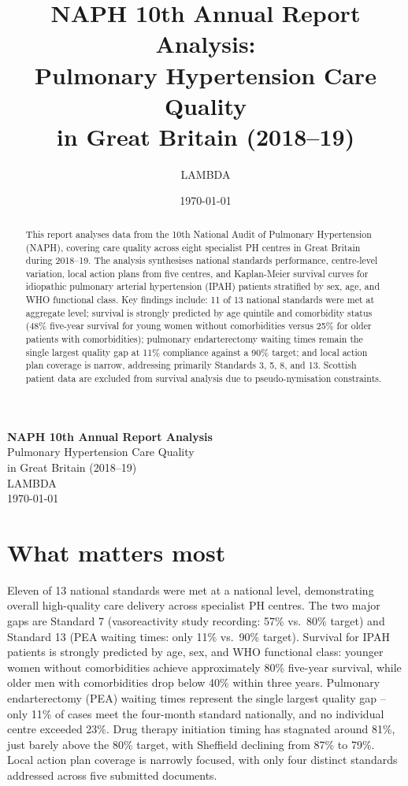 \documentclass[11pt,a4paper]{article}
\title{NAPH 10th Annual Report Analysis:\\Pulmonary Hypertension Care Quality\\in Great Britain (2018--19)}
\author{LAMBDA}
\date{\today}
\begin{document}
\thispagestyle{firstpage}

\begin{center}
  \vspace*{3cm}
  {\LARGE \textbf{NAPH 10th Annual Report Analysis}} \\[0.5em]
  {\Large Pulmonary Hypertension Care Quality} \\[0.3em]
  {\Large in Great Britain (2018--19)} \\[1em]
  {\large LAMBDA} \\[0.5em]
  {\large \today}
\end{center}

\vfill

\begin{abstract}
\noindent This report analyses data from the 10th National Audit of Pulmonary Hypertension (NAPH), covering care quality across eight specialist PH centres in Great Britain during 2018--19. The analysis synthesises national standards performance, centre-level variation, local action plans from five centres, and Kaplan-Meier survival curves for idiopathic pulmonary arterial hypertension (IPAH) patients stratified by sex, age, and WHO functional class. Key findings include: 11 of 13 national standards were met at aggregate level; survival is strongly predicted by age quintile and comorbidity status (48\% five-year survival for young women without comorbidities versus 25\% for older patients with comorbidities); pulmonary endarterectomy waiting times remain the single largest quality gap at 11\% compliance against a 90\% target; and local action plan coverage is narrow, addressing primarily Standards 3, 5, 8, and 13. Scottish patient data are excluded from survival analysis due to pseudo-nymisation constraints.
\end{abstract}

\newpage

\tableofcontents
\newpage

\section{What matters most}

Eleven of 13 national standards were met at a national level, demonstrating overall high-quality care delivery across specialist PH centres. The two major gaps are Standard 7 (vasoreactivity study recording: 57\% vs.\ 80\% target) and Standard 13 (PEA waiting times: only 11\% vs.\ 90\% target). Survival for IPAH patients is strongly predicted by age, sex, and WHO functional class: younger women without comorbidities achieve approximately 80\% five-year survival, while older men with comorbidities drop below 40\% within three years. Pulmonary endarterectomy (PEA) waiting times represent the single largest quality gap -- only 11\% of cases meet the four-month standard nationally, and no individual centre exceeded 23\%. Drug therapy initiation timing has stagnated around 81\%, just barely above the 80\% target, with Sheffield declining from 87\% to 79\%. Local action plan coverage is narrowly focused, with only four distinct standards addressed across five submitted documents.
\end{document}
